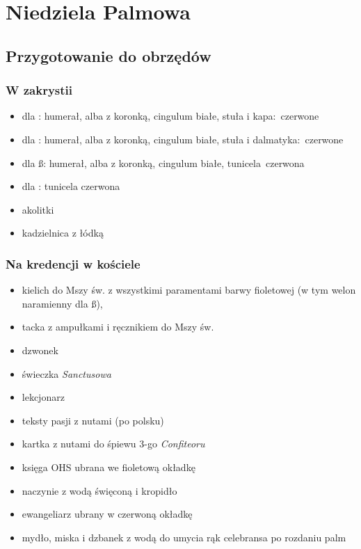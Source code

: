 \chapter{Niedziela Palmowa}

\section{Przygotowanie do obrzędów}

\subsection{W zakrystii}
\begin{itemize}
	\item dla \ii: humerał, alba z koronką, cingulum białe, stuła i
	      kapa: {\color{red}czerwone}
	\item dla \dd: humerał, alba z koronką, cingulum białe, stuła i
	      dalmatyka: {\color{red}czerwone}
	\item dla \ss: humerał, alba z koronką, cingulum białe,
	      tunicela {\color{red}czerwona}
	\item dla : tunicela {\color{red}czerwona}
	\item akolitki
	\item kadzielnica z łódką
\end{itemize}

\subsection{Na kredencji w kościele}
\begin{itemize}
	\item kielich do Mszy św. z wszystkimi paramentami barwy
		      {\color{violet}fioletowej} (w tym welon naramienny dla \ss),
	\item tacka z ampułkami i ręcznikiem do Mszy św.
	\item dzwonek
	\item świeczka \textit{Sanctusowa}
	\item lekcjonarz
	\item teksty pasji z nutami (po polsku)
	\item kartka z nutami do śpiewu 3-go \textit{Confiteoru}
	\item księga OHS ubrana we {\color{violet}fioletową} okładkę
	\item naczynie z wodą święconą i kropidło
	\item ewangeliarz ubrany w {\color{red}czerwoną} okładkę
	\item mydło, miska i dzbanek z wodą do umycia rąk celebransa po rozdaniu
	      palm
\end{itemize}

